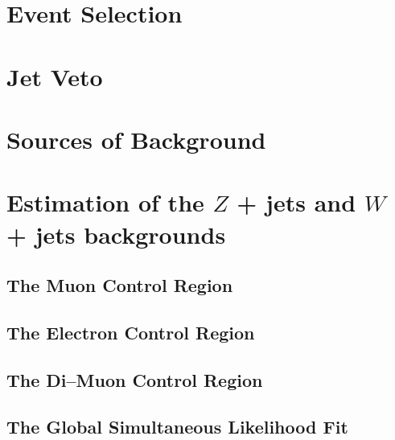 \documentclass[10pt,twoside,cucitura,classica,english,openany]{toptesi}
\begin{document}
\section{Event Selection}
\label{sec:event-selection}



\section{Jet Veto }
\label{sec:jet-veto}



\section{Sources of Background}
\label{sec:sources-background}



\section{Estimation of the $Z$ + jets and $W$ + jets backgrounds}
\label{sec:estimation-z-+}



\subsection{The Muon Control Region}
\label{sec:muon-control-region}



\subsection{The Electron Control Region}
\label{sec:electr-contr-regi}



\subsection{The Di--Muon Control Region}
\label{sec:di-muon-control}



\subsection{The Global Simultaneous Likelihood Fit}
\label{sec:glob-simult-likel}
\end{document}
